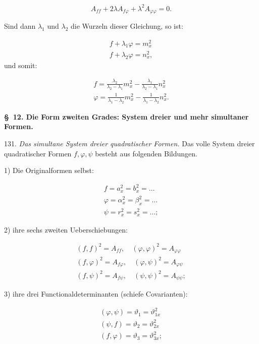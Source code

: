 \[
A_{ff} + 2\lambda A_{f\varphi} + \lambda^2 A_{\varphi\varphi} = 0.
\]

Sind dann $\lambda_1$ und $\lambda_2$ die Wurzeln dieser Gleichung, so ist:

\[
\begin{gathered}
f + \lambda_1\varphi = m_x^2\\
f + \lambda_2\varphi = n_x^2,
\end{gathered}
\]
und somit:

\[
\begin{gathered}
f = \frac{\lambda_2}{\lambda_2-\lambda_1}m_x^2 - \frac{\lambda_1}{\lambda_2-\lambda_1}n_x^2\\
\varphi = \frac{1}{\lambda_1-\lambda_2}m_x^2 - \frac{1}{\lambda_1-\lambda_2}n_x^2.
\end{gathered}
\]

\begin{center}
\textbf{\S\ 12. Die Form zweiten Grades: System dreier und mehr simultaner Formen.}
\end{center}

131. \textit{Das simultane System dreier quadratischer Formen.} Das volle System
dreier quadratischer Formen $f,\varphi,\psi$ besteht aus folgenden Bildungen.

1) Die Originalformen selbst:

\[
\begin{gathered}
f = a_x^2 = b_x^2 = \dots\\
\varphi = \alpha_x^2 = \beta_x^2 = \dots\\
\psi = r_x^2 = s_x^2 = \dots;
\end{gathered}
\]

2) ihre sechs zweiten Ueberschiebungen:

\[
\begin{gathered}
(f,f)^2 = A_{ff}, \quad (\varphi,\varphi)^2 = A_{\varphi\varphi}\\
(f,\varphi)^2 = A_{f\varphi}, \quad (\varphi,\psi)^2 = A_{\varphi\psi}\\
(f,\psi)^2 = A_{f\psi}, \quad (\psi,\psi)^2 = A_{\psi\psi};
\end{gathered}
\]

3) ihre drei Functionaldeterminanten (schiefe Covarianten):

\[
\begin{gathered}
(\varphi,\psi) = \vartheta_1 = \vartheta_{1x}^2\\
(\psi,f) = \vartheta_2 = \vartheta_{2x}^2\\
(f,\varphi) = \vartheta_3 = \vartheta_{3x}^2;
\end{gathered}
\]


